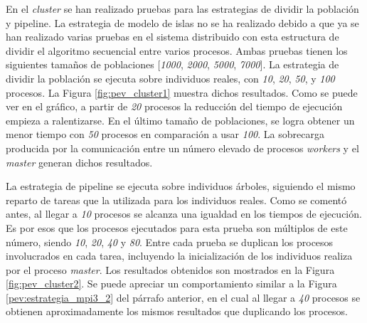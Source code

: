 En el \textit{cluster} se han realizado pruebas para las estrategias de dividir la población y pipeline. La estrategia de modelo de islas no se ha realizado debido a que ya se han realizado varias pruebas en el sistema distribuido con esta estructura de dividir el algoritmo secuencial entre varios procesos. Ambas pruebas tienen los siguientes tamaños de poblaciones [\textit{1000}, \textit{2000}, \textit{5000}, \textit{7000}]. La estrategia de dividir la población se ejecuta sobre individuos reales, con \textit{10}, \textit{20}, \textit{50}, y \textit{100} procesos. La Figura \ref{fig:pev_cluster1} muestra dichos resultados. Como se puede ver en el gráfico, a partir de \textit{20} procesos la reducción del tiempo de ejecución empieza a ralentizarse. En el último tamaño de poblaciones, se logra obtener un menor tiempo con \textit{50} procesos en comparación a usar \textit{100}. La sobrecarga producida por la comunicación entre un número elevado de procesos \textit{workers} y el \textit{master} generan dichos resultados.

La estrategia de pipeline se ejecuta sobre individuos árboles, siguiendo el mismo reparto de tareas que la utilizada para los individuos reales. Como se comentó antes, al llegar a \textit{10} procesos se alcanza una igualdad en los tiempos de ejecución. Es por esos que los procesos ejecutados para esta prueba son múltiplos de este número, siendo \textit{10}, \textit{20}, \textit{40} y \textit{80}. Entre cada prueba se duplican los procesos involucrados en cada tarea, incluyendo la inicialización de los individuos realiza por el proceso \textit{master}. Los resultados obtenidos son mostrados en la Figura \ref{fig:pev_cluster2}. Se puede apreciar un comportamiento similar a la Figura \ref{pev:estrategia_mpi3_2} del párrafo anterior, en el cual al llegar a \textit{40} procesos se obtienen aproximadamente los mismos resultados que duplicando los procesos.




